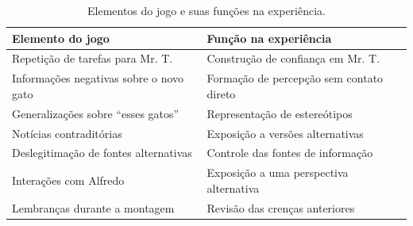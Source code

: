 \begin{table}[ht]
\centering
\caption{Elementos do jogo e suas funções na experiência.}
\label{tab:elementos_jogo}
\begin{tabularx}{\linewidth}{|X|X|}
\hline
\textbf{Elemento do jogo} & \textbf{Função na experiência} \\ \hline
Repetição de tarefas para Mr. T. & Construção de confiança em Mr. T. \\ \hline
Informações negativas sobre o novo gato & Formação de percepção sem contato direto \\ \hline
Generalizações sobre ``esses gatos'' & Representação de estereótipos \\ \hline
Notícias contraditórias & Exposição a versões alternativas \\ \hline
Deslegitimação de fontes alternativas & Controle das fontes de informação \\ \hline
Interações com Alfredo & Exposição a uma perspectiva alternativa \\ \hline
Lembranças durante a montagem & Revisão das crenças anteriores \\ \hline
\end{tabularx}
\end{table}